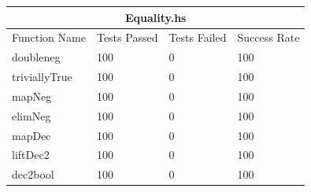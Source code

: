 \documentclass[12pt, svgnames]{article}
\begin{document}
\begin{adjustwidth}{-0.5cm}{}    
    \begin{tabular}[h!]{ |p{5cm}||p{3cm}|p{3cm}|p{3cm}|  }
        
        \hline
        \multicolumn{4}{|c|}{Equality.hs} \\
        \hline
        Function Name & Tests Passed & Tests Failed & Success Rate\\
        \hline
        doubleneg   & 100    &0&   100\\
        triviallyTrue &   100  & 0   &100\\
        mapNeg & 100 & 0&  100\\
        elimNeg & 100 & 0&  100\\
        mapDec  &   100  & 0&100\\
        liftDec2 & 100  & 0   &100\\
        dec2bool & 100  & 0& 100\\
        \hline
    \end{tabular}
\end{adjustwidth}

\end{document}
